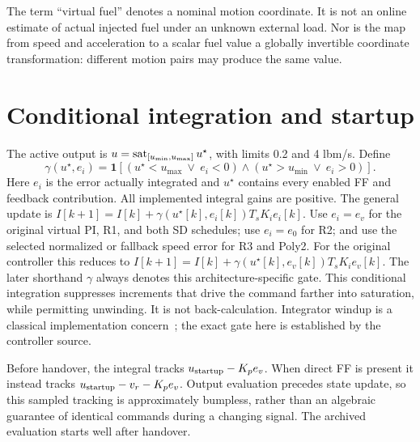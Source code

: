 The term ``virtual fuel'' denotes a nominal motion coordinate. It is not an online estimate of actual injected fuel under an unknown external load. Nor is the map from speed and acceleration to a scalar fuel value a globally invertible coordinate transformation: different motion pairs may produce the same value.

\section{Conditional integration and startup}
The active output is $u=\operatorname{sat}_{[u_{\min},u_{\max}]}u^\star$, with limits 0.2 and 4 lbm/s. Define
\begin{equation}
\gamma(u^\star,e_i)=\mathbf1\!\left[(u^\star<u_{\max}\ \lor\ e_i<0)
\land(u^\star>u_{\min}\ \lor\ e_i>0)\right].
\end{equation}
Here $e_i$ is the error actually integrated and $u^\star$ contains every enabled FF and feedback contribution. All implemented integral gains are positive. The general update is
$I[k+1]=I[k]+\gamma(u^\star[k],e_i[k])T_sK_i e_i[k]$.
Use $e_i=e_v$ for the original virtual PI, R1, and both SD schedules; use $e_i=e_0$ for R2; and use the selected normalized or fallback speed error for R3 and Poly2. For the original controller this reduces to $I[k+1]=I[k]+\gamma(u^\star[k],e_v[k])T_sK_i e_v[k]$.
The later shorthand $\gamma$ always denotes this architecture-specific gate. This conditional integration suppresses increments that drive the command farther into saturation, while permitting unwinding. It is not back-calculation. Integrator windup is a classical implementation concern~\cite{windup}; the exact gate here is established by the controller source.

Before handover, the integral tracks $u_{\rm startup}-K_pe_v$. When direct FF is present it instead tracks $u_{\rm startup}-v_r-K_pe_v$. Output evaluation precedes state update, so this sampled tracking is approximately bumpless, rather than an algebraic guarantee of identical commands during a changing signal. The archived evaluation starts well after handover.


